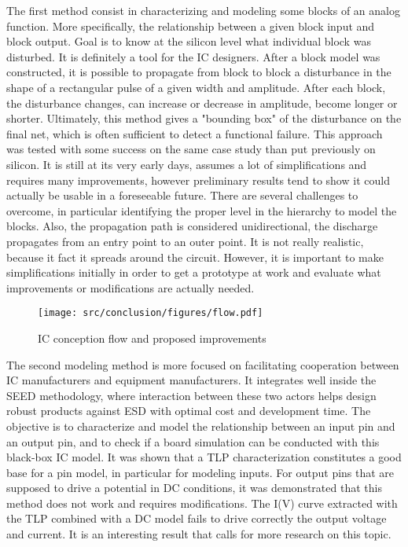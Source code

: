 The first method consist in characterizing and modeling some blocks of an analog function.
More specifically, the relationship between a given block input and block output.
Goal is to know at the silicon level what individual block was disturbed.
It is definitely a tool for the IC designers.
After a block model was constructed, it is possible to propagate from block to block a disturbance in the shape of a rectangular pulse of a given width and amplitude.
After each block, the disturbance changes, can increase or decrease in amplitude, become longer or shorter.
Ultimately, this method gives a "bounding box" of the disturbance on the final net, which is often sufficient to detect a functional failure.
This approach was tested with some success on the same case study than put previously on silicon.
It is still at its very early days, assumes a lot of simplifications and requires many improvements, however preliminary results tend to show it could actually be usable in a foreseeable future.
There are several challenges to overcome, in particular identifying the proper level in the hierarchy to model the blocks.
Also, the propagation path is considered unidirectional, the discharge propagates from an entry point to an outer point.
It is not really realistic, because it fact it spreads around the circuit.
However, it is important to make simplifications initially in order to get a prototype at work and evaluate what improvements or modifications are actually needed.

\begin{figure}[!h]
  \centering
  \texttt{[image: src/conclusion/figures/flow.pdf]}
  \caption{IC conception flow and proposed improvements}
  \label{fig:new-flow}
\end{figure}

The second modeling method is more focused on facilitating cooperation between IC manufacturers and equipment manufacturers.
It integrates well inside the SEED methodology, where interaction between these two actors helps design robust products against ESD with optimal cost and development time.
The objective is to characterize and model the relationship between an input pin and an output pin, and to check if a board simulation can be conducted with this black-box IC model.
It was shown that a TLP characterization constitutes a good base for a pin model, in particular for modeling inputs.
For output pins that are supposed to drive a potential in DC conditions, it was demonstrated that this method does not work and requires modifications.
The I(V) curve extracted with the TLP combined with a DC model fails to drive correctly the output voltage and current.
It is an interesting result that calls for more research on this topic.


